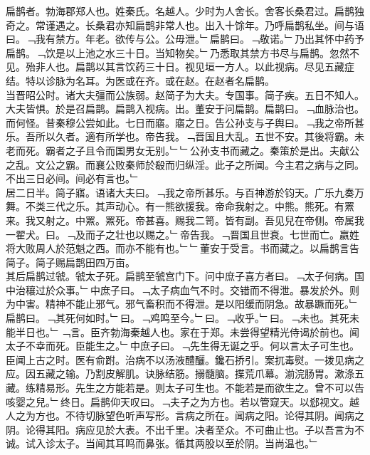 \documentclass{zhvt-classic}
\begin{document}

\hspace*{2em}扁鹊者。勃海郡郑人也。姓秦氏。名越人。少时为人舍长。舍客长桑君过。扁鹊独奇之。常谨遇之。长桑君亦知扁鹊非常人也。出入十馀年。乃呼扁鹊私坐。间与语曰。﹁我有禁方。年老。欲传与公。公毋泄。﹂扁鹊曰。﹁敬诺。﹂乃出其怀中药予扁鹊。﹁饮是以上池之水三十日。当知物矣。﹂乃悉取其禁方书尽与扁鹊。忽然不见。殆非人也。扁鹊以其言饮药三十日。视见垣一方人。以此视病。尽见五藏症结。特以诊脉为名耳。为医或在齐。或在赵。在赵者名扁鹊。\\
\hspace*{2em}当晋昭公时。诸大夫彊而公族弱。赵简子为大夫。专国事。简子疾。五日不知人。大夫皆惧。於是召扁鹊。扁鹊入视病。出。董安于问扁鹊。扁鹊曰。﹁血脉治也。而何怪。昔秦穆公尝如此。七日而寤。寤之日。告公孙支与子舆曰。﹁我之帝所甚乐。吾所以久者。適有所学也。帝告我。﹁晋国且大乱。五世不安。其後将霸。未老而死。霸者之子且令而国男女无别。﹂﹂公孙支书而藏之。秦策於是出。夫献公之乱。文公之霸。而襄公败秦师於殽而归纵淫。此子之所闻。今主君之病与之同。不出三日必间。间必有言也。﹂\\
\hspace*{2em}居二日半。简子寤。语诸大夫曰。﹁我之帝所甚乐。与百神游於钧天。广乐九奏万舞。不类三代之乐。其声动心。有一熊欲援我。帝命我射之。中熊。熊死。有罴来。我又射之。中罴。罴死。帝甚喜。赐我二笥。皆有副。吾见兒在帝侧。帝属我一翟犬。曰。﹁及而子之壮也以赐之。﹂帝告我。﹁晋国且世衰。七世而亡。嬴姓将大败周人於范魁之西。而亦不能有也。﹂﹂董安于受言。书而藏之。以扁鹊言告简子。简子赐扁鹊田四万亩。\\
\hspace*{2em}其后扁鹊过虢。虢太子死。扁鹊至虢宫门下。问中庶子喜方者曰。﹁太子何病。国中治穰过於众事。﹂中庶子曰。﹁太子病血气不时。交错而不得泄。暴发於外。则为中害。精神不能止邪气。邪气畜积而不得泄。是以阳缓而阴急。故暴蹶而死。﹂扁鹊曰。﹁其死何如时。﹂曰。﹁鸡鸣至今。﹂曰。﹁收乎。﹂曰。﹁未也。其死未能半日也。﹂﹁言。臣齐勃海秦越人也。家在于郑。未尝得望精光侍谒於前也。闻太子不幸而死。臣能生之。﹂中庶子曰。﹁先生得无诞之乎。何以言太子可生也。臣闻上古之时。医有俞跗。治病不以汤液醴釃。鑱石挢引。案扤毒熨。一拨见病之应。因五藏之输。乃割皮解肌。诀脉结筋。搦髓脑。揲荒爪幕。湔浣肠胃。漱涤五藏。练精易形。先生之方能若是。则太子可生也。不能若是而欲生之。曾不可以告咳婴之兒。﹂终日。扁鹊仰天叹曰。﹁夫子之为方也。若以管窥天。以郄视文。越人之为方也。不待切脉望色听声写形。言病之所在。闻病之阳。论得其阴。闻病之阴。论得其阳。病应见於大表。不出千里。决者至众。不可曲止也。子以吾言为不诚。试入诊太子。当闻其耳鸣而鼻张。循其两股以至於阴。当尚温也。﹂\\
\end{document}
